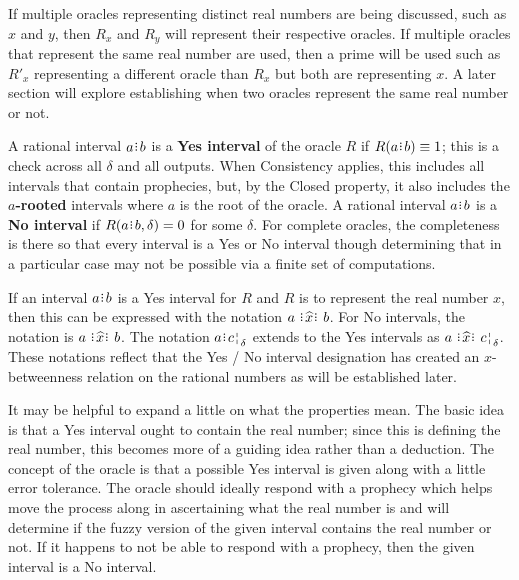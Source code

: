 \documentclass[12pt]{article}
\begin{document}
If multiple oracles representing distinct real numbers are being discussed, such as $x$ and $y$, then $R_x$ and $R_y$ will represent their respective oracles. If multiple oracles that represent the same real number are used, then a prime will be used such as $R'_x$ representing a different oracle than $R_x$ but both are representing $x$. A later section will explore establishing when two oracles represent the same real number or not. 

A rational interval $a\rint b$ is a \textbf{Yes interval} of the oracle $R$ if $R(a\rint b) \equiv 1$; this is a check across all $\delta$ and all outputs. When Consistency applies, this includes all intervals that contain prophecies, but, by the Closed property, it also includes the \textbf{$a$-rooted} intervals where $a$ is the root of the oracle.   A rational interval $a\rint b$ is a \textbf{No interval} if $R(a\rint b, \delta) = 0$ for some $\delta$. For complete oracles, the completeness is there so that every interval is a Yes or No interval though determining that in a particular case may not be possible via a finite set of computations. 

If an interval $a\rint b$ is a Yes interval for $R$ and $R$ is to represent the real number $x$, then this can be expressed with the notation $a \xora b$. For No intervals, the notation is \sout{$a \xora b$}. The notation $a\rint \fuzbright{c}$ extends to the Yes intervals as $a \xora \fuzbright{c}$. These notations reflect that the Yes / No interval designation has created an $x$-betweenness relation on the rational numbers as will be established later.

It may be helpful to expand a little on what the properties mean. The basic idea is that a Yes interval ought to contain the real number; since this is defining the real number, this becomes more of a guiding idea rather than a deduction. The concept of the oracle is that a possible Yes interval is given along with a little error tolerance. The oracle should ideally respond with a prophecy which helps move the process along in ascertaining what the real number is and will determine if the fuzzy version of the given interval contains the real number or not. If it happens to not be able to respond with a prophecy, then the given interval is a No interval. 
\end{document}
